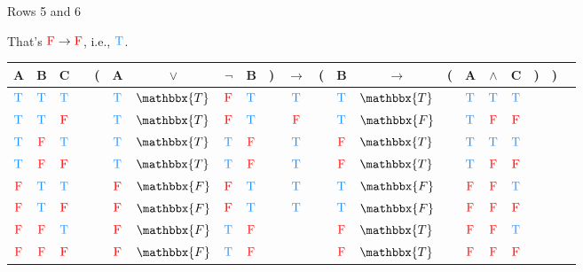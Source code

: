 \documentclass[
  ignorenonframetext,
]{beamer}
\renewcommand{\,}{\text{, }}
\def\True{\textcolor{dodgerblue}{\text{T}}}
\def\False{\textcolor{red}{\text{F}}}
\begin{document}
\begin{frame}{Rows 5 and 6}
\protect\hypertarget{rows-5-and-6}{}

That's \(\False \rightarrow \False\), i.e., \(\True\).

\begin{center}
\bigskip
\begin{tabular}{@{ }c@{ }@{ }c@{ }@{ }c | c@{ }@{}c@{}@{ }c@{ }@{ }c@{ }@{ }c@{ }@{ }c@{ }@{}c@{}@{ }c@{ }@{}c@{}@{ }c@{ }@{ }c@{ }@{}c@{}@{ }c@{ }@{ }c@{ }@{ }c@{ }@{}c@{}@{}c@{}@{ }c}
A & B & C &  & ( & A & $\vee$ & $\neg$ & B & ) & $\rightarrow$ & ( & B & $\rightarrow$ & ( & A & $\wedge$ & C & ) & ) & \\
\hline 
 $\True$ & $\True$ & $\True$ &  &  & $\True$ & $\mathbbx{T}$ & $\False$ & $\True$ &  &\textcolor{red}{$\True$}&  & $\True$ & $\mathbbx{T}$ &  & $\True$ & $\True$ & $\True$ &  &  & \\
 $\True$ & $\True$ & $\False$ &  &  & $\True$ & $\mathbbx{T}$ & $\False$ & $\True$ &  &\textcolor{red}{$\False$}&  & $\True$ & $\mathbbx{F}$ &  & $\True$ & $\False$ & $\False$ &  &  & \\
 $\True$ & $\False$ & $\True$ &  &  & $\True$ & $\mathbbx{T}$ & $\True$ & $\False$ &  &\textcolor{red}{$\True$}&  & $\False$ & $\mathbbx{T}$ &  & $\True$ & $\True$ & $\True$ &  &  & \\
 $\True$ & $\False$ & $\False$ &  &  & $\True$ & $\mathbbx{T}$ & $\True$ & $\False$ &  &\textcolor{red}{$\True$}&  & $\False$ & $\mathbbx{T}$ &  & $\True$ & $\False$ & $\False$ &  &  & \\
 $\False$ & $\True$ & $\True$ &  &  & $\False$ & $\mathbbx{F}$ & $\False$ & $\True$ &  &\textcolor{red}{$\True$}&  & $\True$ & $\mathbbx{F}$ &  & $\False$ & $\False$ & $\True$ &  &  & \\
 $\False$ & $\True$ & $\False$ &  &  & $\False$ & $\mathbbx{F}$ & $\False$ & $\True$ &  &\textcolor{red}{$\True$}&  & $\True$ & $\mathbbx{F}$ &  & $\False$ & $\False$ & $\False$ &  &  & \\
 $\False$ & $\False$ & $\True$ &  &  & $\False$ & $\mathbbx{F}$ & $\True$ & $\False$ &  &&  & $\False$ & $\mathbbx{T}$ &  & $\False$ & $\False$ & $\True$ &  &  & \\
 $\False$ & $\False$ & $\False$ &  &  & $\False$ & $\mathbbx{F}$ & $\True$ & $\False$ &  &&  & $\False$ & $\mathbbx{T}$ &  & $\False$ & $\False$ & $\False$ &  &  & \\
\end{tabular}
\bigskip
\end{center}

\end{frame}
\end{document}

